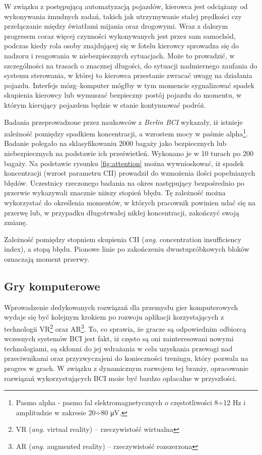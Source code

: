 \documentclass[skorowidz,skroty]{dyplomWEZUT}
\begin{document}
W związku z postępującą automatyzacją pojazdów, kierowca jest odciążany od wykonywania żmudnych zadań, takich jak utrzymywanie stałej prędkości czy przełączanie między światłami mijania oraz drogowymi. Wraz z dalszym progresem coraz więcej czynności wykonywanych jest przez sam samochód, podczas kiedy rola osoby znajdującej się w fotelu kierowcy sprowadza się do nadzoru i reagowania w niebezpiecznych sytuacjach. Może to prowadzić, w szczególności na trasach o znacznej długości, do sytuacji nadmiernego zaufania do systemu sterowania, w której to kierowca przestanie zwracać uwagę na działania pojazdu. Interfejs mózg--komputer mógłby w tym momencie sygnalizować spadek skupienia kierowcy lub wymuszać bezpieczny postój pojazdu do momentu, w którym kierujący pojazdem będzie w stanie kontynuować podróż.

Badania przeprowadzone przez naukowców z \textit{Berlin BCI} wykazały, iż istnieje zależność pomiędzy spadkiem koncentracji, a wzrostem mocy w paśmie alpha\footnote{Pasmo alpha - pasmo fal elektromagnetycznych o częstotliwości 8÷12 Hz i amplitudzie w zakresie 20÷80 μV\cite[str. 17]{bci_handbook}.}\cite{berlinbci_attention}. Badanie polegało na sklasyfikowaniu 2000 bagaży jako bezpiecznych lub niebezpiecznych na podstawie ich prześwietleń. Wykonano je w 10 turach po 200 bagaży. Na podstawie rysunku \vref{fig:attention} można wywnioskować, iż spadek koncentracji (wzrost parametru CII) prowadził do wzmożenia ilości popełnianych błędów. Uczestnicy rzeczonego badania na okres następujący bezpośrednio po przerwie wykazywali znacznie niższy stopień błędu. Tę zależność można wykorzystać do określenia momentów, w których pracownik powinien udać się na przerwę lub, w przypadku długotrwałej nikłej koncentracji, zakończyć swoją zmianę.

{Zależność pomiędzy stopniem skupienia CII (\textit{ang.} concentration insufficiency index), a stopą błędu. Pionowe linie po zakończeniu dwustupróbkowych bloków oznaczają moment przerwy.\label{fig:attention}}
{\cite{berlinbci_attention}}


\subsection{Gry komputerowe}
Wprowadzenie dedykowanych rozwiązań dla przemysłu gier komputerowych wydaje się być kolejnym krokiem po rozwoju aplikacji korzystających z technologii VR\footnote{VR (\textit{ang.} virtual reality) -- rzeczywistość wirtualna} oraz AR\footnote{AR (\textit{ang.} augmented reality) -- rzeczywistość rozszerzona}. To, co sprawia, że gracze są odpowiednim odbiorcą wczesnych systemów BCI jest fakt, iż często są oni zainteresowani nowymi technologiami, są skłonni do jej wdrażania w celu uzyskania przewagi nad przeciwnikami oraz przyzwyczajeni do konieczności treningu, który pozwala na progres w grach\cite{bci_games_survey}. W związku z dynamicznym rozwojem tej branży, opracowanie rozwiązań wykorzystujących BCI może być bardzo opłacalne w przyszłości.
\end{document}
